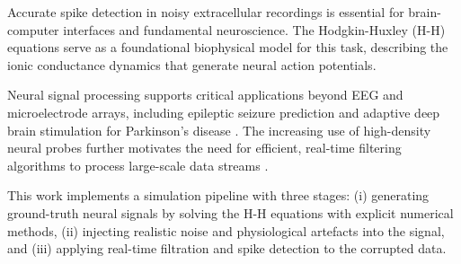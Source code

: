 Accurate spike detection in noisy extracellular recordings is essential for brain-computer 
interfaces and fundamental neuroscience. 
The Hodgkin-Huxley (H-H) equations serve as a foundational biophysical model for this task, 
describing the ionic conductance dynamics that generate neural action potentials.

Neural signal processing supports critical applications beyond EEG and microelectrode arrays, 
including epileptic seizure prediction \citep{addai-domfe2024epileptic} and adaptive deep brain 
stimulation for Parkinson's disease \citep{aljalal2022parkinson}. 
The increasing use of high-density neural probes further motivates the need for efficient, 
real-time filtering algorithms to process large-scale data streams \citep{ye2024ultra}.

This work implements a simulation pipeline with three stages:
(i) generating ground-truth neural signals by solving the H-H equations with explicit numerical methods,
(ii) injecting realistic noise and physiological artefacts into the signal,
and (iii) applying real-time filtration and spike detection to the corrupted data.